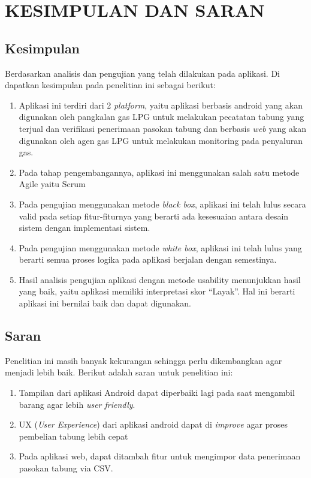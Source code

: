 
\chapter{KESIMPULAN DAN SARAN}

\section{Kesimpulan}
	Berdasarkan analisis dan pengujian yang telah dilakukan pada aplikasi. Di dapatkan kesimpulan pada penelitian ini sebagai berikut:

	\begin{enumerate}
		\item Aplikasi ini terdiri dari 2 \textit{platform}, yaitu aplikasi berbasis android yang akan digunakan oleh pangkalan gas LPG untuk melakukan pecatatan tabung yang terjual dan verifikasi penerimaan pasokan tabung dan berbasis \textit{web} yang akan digunakan oleh agen gas LPG untuk melakukan monitoring pada penyaluran gas.
		\item Pada tahap pengembangannya, aplikasi ini menggunakan salah satu metode Agile yaitu Scrum
		\item Pada pengujian menggunakan metode \textit{black box}, aplikasi ini telah lulus secara valid pada setiap fitur-fiturnya yang berarti ada kesesuaian antara desain sistem dengan implementasi sistem.  
		\item Pada pengujian menggunakan metode \textit{white box}, aplikasi ini telah lulus yang berarti semua proses logika pada aplikasi berjalan dengan semestinya.
		\item Hasil analisis pengujian aplikasi dengan metode usability menunjukkan hasil yang baik, yaitu aplikasi memiliki interpretasi skor “Layak”. Hal ini berarti aplikasi ini bernilai baik dan dapat digunakan.
		
	\end{enumerate}


\section{Saran}

	Penelitian ini masih banyak kekurangan sehingga perlu dikembangkan agar menjadi lebih baik. Berikut adalah saran untuk penelitian ini:
	\begin{enumerate}
		\item Tampilan dari aplikasi Android dapat diperbaiki lagi pada saat mengambil barang agar lebih \textit{user friendly}. 
		\item UX (\textit{User Experience}) dari aplikasi android dapat di \textit{improve} agar proses pembelian tabung lebih cepat
		\item Pada aplikasi web, dapat ditambah fitur untuk mengimpor data penerimaan pasokan tabung via CSV. 
	\end{enumerate}

	
\begin{comment}

\end{comment}
